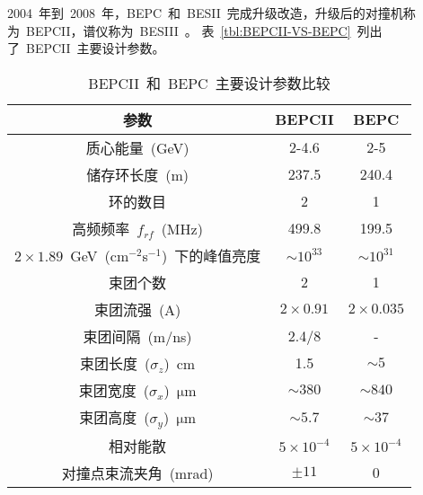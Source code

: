 2004~年到~2008~年，BEPC~和~BESII~完成升级改造，升级后的对撞机称为~BEPCII，谱仪称为~BESIII~\cite{M.A:2010}。%
表~\ref{tbl:BEPCII-VS-BEPC}~列出了~BEPCII~主要设计参数。
\begin{table}[htp]
  \centering
  \caption{\label{tbl:BEPCII-VS-BEPC} BEPCII~和~BEPC~主要设计参数比较}
  \begin{tabular}{ccc}
    \hline\hline
    参数 & BEPCII & BEPC \\
    \hline
    质心能量~(GeV) & 2-4.6 & 2-5 \\
    储存环长度~(m) & 237.5 & 240.4 \\
    环的数目 & 2 & 1 \\
    高频频率~$f_{rf}$~(MHz) & 499.8 & 199.5 \\
    $2\times1.89$~GeV~(cm$^{-2}$s$^{-1}$)~下的峰值亮度 & $\sim10^{33}$ & $\sim10^{31}$ \\
    束团个数 & 2 & 1 \\
    束团流强~(A) & $2 \times 0.91$ & $2 \times 0.035$ \\
    束团间隔~(m/ns) & 2.4/8 & - \\
    束团长度~($\sigma_z$)~cm & 1.5 & $\sim 5$ \\
    束团宽度~($\sigma_x$)~$\mathrm{\mu m}$ & $\sim380$ & $\sim840$ \\
    束团高度~($\sigma_y$)~$\mathrm{\mu m}$ & $\sim5.7$ & $\sim37$ \\
    相对能散 & $5 \times 10^{-4}$ & $5 \times 10^{-4}$ \\
    对撞点束流夹角~(mrad) & $\pm 11$ & 0 \\
    \hline\hline
  \end{tabular}
  \label{tab:bepciiParam}
\end{table}

